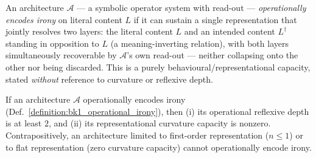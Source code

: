 \begin{definition}
\label{definition:bk1_operational_irony}
An architecture $\mathcal{A}$ --- a symbolic operator system with read-out ---
\emph{operationally encodes irony} on literal content $L$ if it can sustain a
single representation that jointly resolves two layers: the literal content $L$
and an intended content $L^{\dagger}$ standing in opposition to $L$ (a
meaning-inverting relation), with both layers simultaneously recoverable by
$\mathcal{A}$'s own read-out --- neither collapsing onto the other nor being
discarded. This is a purely behavioural/representational capacity, stated
\emph{without} reference to curvature or reflexive depth.
\end{definition}

\begin{theorem}
\label{theorem:bk1_operational_irony_requires_reflexive_curvature}
If an architecture $\mathcal{A}$ operationally encodes irony
(Def.~\ref{definition:bk1_operational_irony}), then (i) its operational reflexive
depth is at least $2$, and (ii) its representational curvature capacity is
nonzero. Contrapositively, an architecture limited to first-order representation
($n\le1$) or to flat representation (zero curvature capacity) cannot operationally
encode irony.
\end{theorem}

